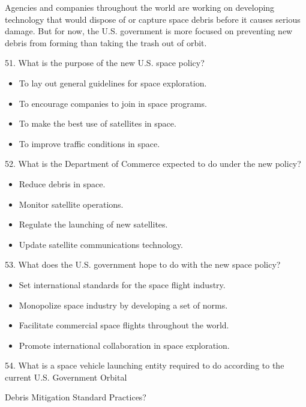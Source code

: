 \documentclass[UTF8,11pt]{ctexart}
\begin{document}
Agencies and companies throughout the world are working on developing technology that would dispose of or capture space debris before it causes serious damage. But for now, the U.S. government is more focused on preventing new debris from forming than taking the trash out of orbit.


51. What is the purpose of the new U.S. space policy?


\begin{itemize}[leftmargin=2em,itemsep=.2em,topsep=.4em]\item[A.] To lay out general guidelines for space exploration.
\item[B.] To encourage companies to join in space programs.
\item[C.] To make the best use of satellites in space.
\item[D.] To improve traffic conditions in space.
\end{itemize}

52. What is the Department of Commerce expected to do under the new policy?


\begin{itemize}[leftmargin=2em,itemsep=.2em,topsep=.4em]\item[A.] Reduce debris in space.
\item[B.] Monitor satellite operations.
\item[C.] Regulate the launching of new satellites.
\item[D.] Update satellite communications technology.
\end{itemize}

53. What does the U.S. government hope to do with the new space policy?


\begin{itemize}[leftmargin=2em,itemsep=.2em,topsep=.4em]\item[A.] Set international standards for the space flight industry.
\item[B.] Monopolize space industry by developing a set of norms.
\item[C.] Facilitate commercial space flights throughout the world.
\item[D.] Promote international collaboration in space exploration.
\end{itemize}

54. What is a space vehicle launching entity required to do according to the current U.S. Government Orbital


Debris Mitigation Standard Practices?
\end{document}
